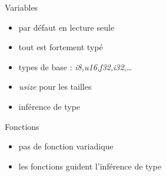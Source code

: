 \begin{frame}[fragile]{Variables}
\protect\hypertarget{variables}{}
\begin{Shaded}
\begin{Highlighting}[]
    \OperatorTok{=} \OperatorTok{;}
    \OperatorTok{:}  \OperatorTok{=} \OperatorTok{;}
     \OperatorTok{=} \OperatorTok{;}
\OperatorTok{{-}=} \OperatorTok{;}
    \OperatorTok{:}  \OperatorTok{=} \OperatorTok{;}
\end{Highlighting}
\end{Shaded}

\begin{itemize}
\tightlist
\item
  par défaut en lecture seule
\item
  tout est fortement typé
\item
  types de base : \emph{i8,u16,f32,i32},\ldots{}
\item
  \emph{usize} pour les tailles
\item
  inférence de type
\end{itemize}
\end{frame}

\begin{frame}[fragile]{Fonctions}
\protect\hypertarget{fonctions}{}
\begin{Shaded}
\begin{Highlighting}[]
\OperatorTok{:} \OperatorTok{,}\OperatorTok{:} \NormalTok{) }\OperatorTok{{-}\textgreater{}}  \OperatorTok{\{}
\OperatorTok{+}
\OperatorTok{\}}

\OperatorTok{=} \OperatorTok{;}
\OperatorTok{,} \NormalTok{)}\OperatorTok{;}
\end{Highlighting}
\end{Shaded}

\begin{itemize}
\tightlist
\item
  pas de fonction variadique
\item
  les fonctions guident l'inférence de type
\end{itemize}
\end{frame}

